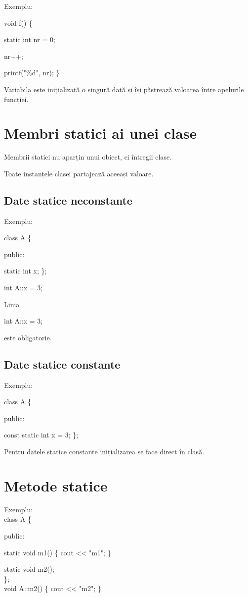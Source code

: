 \documentclass[12pt,a4paper]{article}
\begin{document}
Exemplu:

void f() \{

    static int nr = 0;

    nr++;

    printf("\%d", nr);
\}

Variabila este inițializată o singură dată și își păstrează valoarea între apelurile funcției.

\section{Membri statici ai unei clase}

Membrii statici nu aparțin unui obiect, ci întregii clase.

Toate instanțele clasei partajează aceeași valoare.

\subsection{Date statice neconstante}

Exemplu:

class A \{

public:

    static int x;
\};

int A::x = 3;

Linia

int A::x = 3;

este obligatorie.

\subsection{Date statice constante}

Exemplu:

class A \{

public:

    const static int x = 3;
\};

Pentru datele statice constante inițializarea se face direct în clasă.

\section{Metode statice}

Exemplu:
\\
class A \{

public:

    static void m1() \{
        cout << "m1";
    \}

    static void m2();\\
\};
\\
void A::m2() \{
    cout << "m2";
\}
\end{document}
